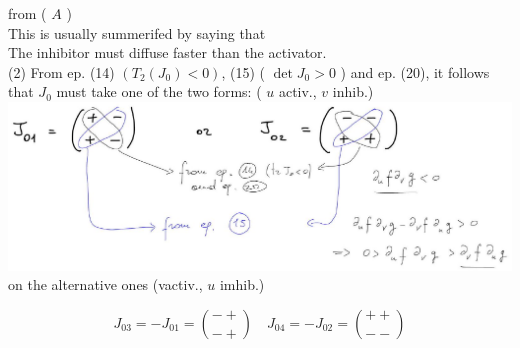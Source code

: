 \documentclass[10pt]{article}
\begin{document}
from ( $A$ )\\
This is usually summerifed by saying that\\
The inhibitor must diffuse faster than the activator.\\
(2) From ep. (14) $\left(T_{2}\left(J_{0}\right)<0\right)$, (15) ( $\operatorname{det} J_{0}>0$ ) and ep. (20), it follows that $J_{0}$ must take one of the two forms: ( $u$ activ., $v$ inhib.)\\
\includegraphics[max width=\textwidth, center]{2025_10_17_3cf351a4349ae3691080g-11}\\
on the alternative ones (vactiv., $u$ imhib.)

$$
J_{03}=-J_{01}=\binom{-+}{-+} \quad J_{04}=-J_{02}=\binom{++}{--}
$$
\end{document}
